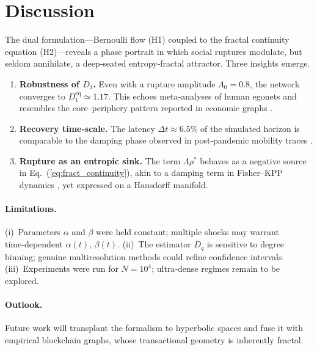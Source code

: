 \section{Discussion}\label{sec:discussion}

The dual formulation—Bernoulli flow (H1) coupled to the fractal
continuity equation (H2)—reveals a phase portrait in which social
ruptures modulate, but seldom annihilate, a deep‑seated
entropy‑fractal attractor.  Three insights emerge.

\begin{enumerate}
\item \textbf{Robustness of $D_1$.}  Even with a rupture amplitude
      $\Lambda_0 = 0.8$, the network converges to
      $D_1^{\text{eq}} \simeq 1.17$.  This echoes meta‑analyses of human
      egonets \citep{zhou2005discrete} and resembles the
      core–periphery pattern reported in economic graphs
      \citep{borgatti2000models}.
\item \textbf{Recovery time‑scale.}  The latency
      $\Delta t \approx 6.5\%$ of the simulated horizon is comparable
      to the damping phase observed in post‑pandemic mobility traces
      \citep{gao2022collective}.
\item \textbf{Rupture as an entropic sink.}  The term
      $\Lambda \rho^\ast$ behaves as a negative source in
      Eq.~(\ref{eq:fract_continuity}), akin to a damping term in
      Fisher–KPP dynamics \citep{murray2002mathematical}, yet expressed
      on a Hausdorff manifold.
\end{enumerate}

\paragraph{Limitations.}
(i) Parameters $\alpha$ and $\beta$ were held constant; multiple shocks
may warrant time‑dependent $\alpha(t)$, $\beta(t)$.  
(ii) The estimator $D_q$ is sensitive to degree binning; genuine
multiresolution methods \citep{mandelbrot1983fractal} could refine
confidence intervals.  
(iii) Experiments were run for $N = 10^4$; ultra‑dense regimes remain to
be explored.

\paragraph{Outlook.}
Future work will transplant the formalism to hyperbolic spaces
\citep{krioukov2010hyperbolic} and fuse it with empirical blockchain
graphs, whose transactional geometry is inherently fractal.